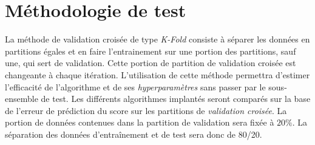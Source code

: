 \documentclass[french]{article}
\begin{document}

\section{Méthodologie de test}

La méthode de validation croisée de type \emph{K-Fold} consiste à séparer les données en partitions égales et en faire l'entrainement sur une portion des partitions, sauf une, qui sert de validation. Cette portion de partition de validation croisée est changeante à chaque itération. L'utilisation de cette méthode permettra d'estimer l'efficacité de l'algorithme et de ses \emph{hyperparamètres} sans passer par le sous-ensemble de test. Les différents algorithmes implantés seront comparés sur la base de l'erreur de prédiction du score sur les partitions de \emph{validation croisée}. La portion de données contenues dans la partition de validation sera fixée à $20\%$. La séparation des données d'entraînement et de test sera donc de 80/20.







\end{document}
